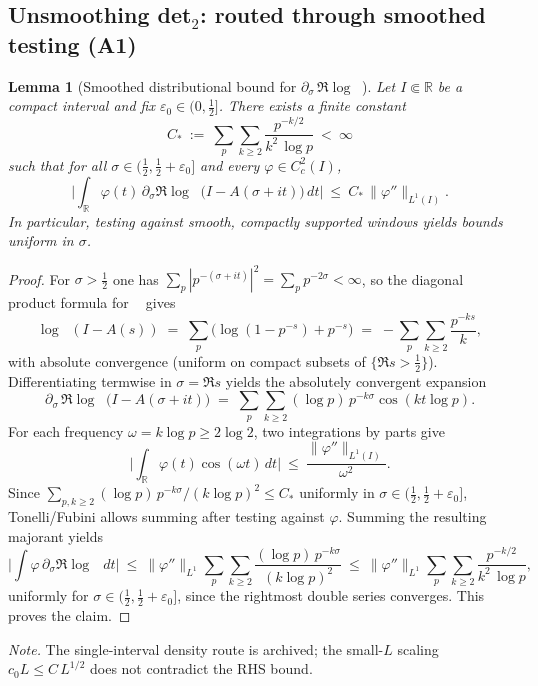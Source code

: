 \documentclass[11pt]{article}
\newtheorem{lemma}[theorem]{Lemma}
\theoremstyle{definition}
\theoremstyle{remark}
\theoremstyle{definition}
\newcommand{\R}{\mathbb{R}}
\DeclareMathOperator{\dettwo}{det_2}
\begin{document}
\subsection*{Unsmoothing det$_2$: routed through smoothed testing (A1)}
\begin{lemma}[Smoothed distributional bound for $\partial_\sigma\,\Re\log\dettwo$]\label{lem:det2-unsmoothed}
Let $I\Subset\R$ be a compact interval and fix $\varepsilon_0\in(0,\tfrac12]$. There exists a finite constant
\[
  C_*\ :=\ \sum_{p}\sum_{k\ge 2}\frac{p^{-k/2}}{k^2\,\log p}\ <\ \infty
\]
such that for all $\sigma\in(\tfrac12,\tfrac12+\varepsilon_0]$ and every $\varphi\in C_c^2(I)$,
\[
  \Big|\int_{\R} \varphi(t)\,\partial_\sigma\Re\log\dettwo\big(I-A(\sigma+it)\big)\,dt\Big|\ \le\ C_*\,\|\varphi''\|_{L^1(I)}.
\]
In particular, testing against smooth, compactly supported windows yields bounds uniform in $\sigma$.
\end{lemma}
\begin{proof}
For $\sigma>\tfrac12$ one has $\sum_p |p^{-(\sigma+it)}|^2=\sum_p p^{-2\sigma}<\infty$, so the diagonal product formula for $\dettwo$ gives
\[
  \log\dettwo(I-A(s))
  \;=\;\sum_p\big(\log(1-p^{-s})+p^{-s}\big)
  \;=\;-\sum_p\sum_{k\ge 2}\frac{p^{-ks}}{k},
\]
with absolute convergence (uniform on compact subsets of $\{\Re s>\tfrac12\}$). Differentiating termwise in $\sigma=\Re s$ yields the absolutely convergent expansion
\[
  \partial_\sigma\,\Re\log\dettwo\big(I-A(\sigma+it)\big)
  \;=\; \sum_{p}\sum_{k\ge 2} (\log p)\,p^{-k\sigma}\cos(k t\log p).
\]
For each frequency $\omega=k\log p\ge 2\log 2$, two integrations by parts give
\[
  \Big|\int_{\R}\!\varphi(t)\cos(\omega t)\,dt\Big|\ \le\ \frac{\|\varphi''\|_{L^1(I)}}{\omega^2}.
\]
Since $\sum_{p,k\ge 2} (\log p)\,p^{-k\sigma}/(k\log p)^2\le C_*$ uniformly in $\sigma\in(\tfrac12,\tfrac12+\varepsilon_0]$, Tonelli/Fubini allows summing after testing against $\varphi$. Summing the resulting majorant yields
\[
  \Big|\int \varphi\,\partial_\sigma\Re\log\dettwo\,dt\Big|
  \ \le\ \|\varphi''\|_{L^1}\sum_{p}\sum_{k\ge 2}\frac{(\log p)\,p^{-k\sigma}}{(k\log p)^2}
  \ \le\ \|\varphi''\|_{L^1}\sum_{p}\sum_{k\ge 2}\frac{p^{-k/2}}{k^2\,\log p},
\]
uniformly for $\sigma\in(\tfrac12,\tfrac12+\varepsilon_0]$, since the rightmost double series converges. This proves the claim.
\end{proof}
\noindent\emph{Note.} The single-interval density route is archived; the small-$L$ scaling $c_0 L \le C\,L^{1/2}$ does not contradict the RHS bound.
\end{document}
